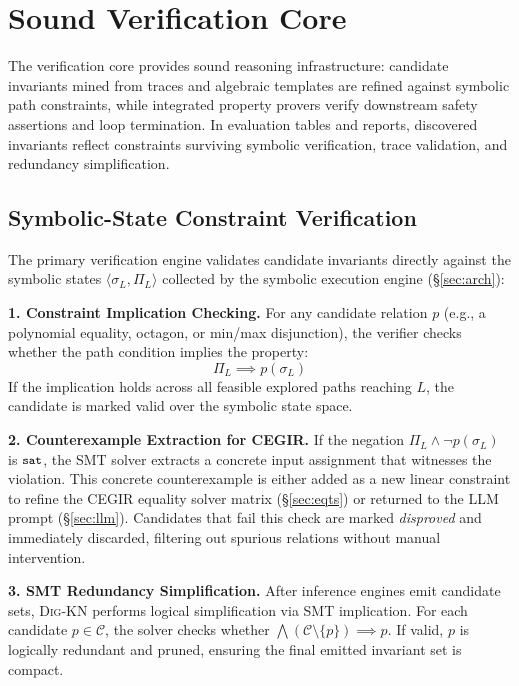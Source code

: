 \documentclass[runningheads]{llncs}
\newcommand{\tool}{\textsc{Dig-KN}\xspace}
\newcommand{\code}[1]{\texttt{\small #1}}
\begin{document}
\section{Sound Verification Core}
\label{sec:verify}

The verification core provides sound reasoning infrastructure: candidate invariants mined from traces and algebraic templates are refined against symbolic path constraints, while integrated property provers verify downstream safety assertions and loop termination. In evaluation tables and reports, discovered invariants reflect constraints surviving symbolic verification, trace validation, and redundancy simplification.

\subsection{Symbolic-State Constraint Verification}
\label{sec:symbolic_ver}

The primary verification engine validates candidate invariants directly against the symbolic states $\langle\sigma_L, \Pi_L\rangle$ collected by the symbolic execution engine (\S\ref{sec:arch}):

\medskip\noindent\textbf{1. Constraint Implication Checking.}
For any candidate relation $p$ (e.g., a polynomial equality, octagon, or min/max disjunction), the verifier checks whether the path condition implies the property:
$$\Pi_L \implies p(\sigma_L)$$
If the implication holds across all feasible explored paths reaching $L$, the candidate is marked valid over the symbolic state space.

\medskip\noindent\textbf{2. Counterexample Extraction for CEGIR.}
If the negation $\Pi_L \land \neg p(\sigma_L)$ is $\code{sat}$, the SMT solver extracts a concrete input assignment that witnesses the violation. This concrete counterexample is either added as a new linear constraint to refine the CEGIR equality solver matrix (\S\ref{sec:eqts}) or returned to the LLM prompt (\S\ref{sec:llm}). Candidates that fail this check are marked \emph{disproved} and immediately discarded, filtering out spurious relations without manual intervention.

\medskip\noindent\textbf{3. SMT Redundancy Simplification.}
After inference engines emit candidate sets, \tool{} performs logical simplification via SMT implication. For each candidate $p \in \mathcal{C}$, the solver checks whether $\bigwedge (\mathcal{C} \setminus \{p\}) \implies p$. If valid, $p$ is logically redundant and pruned, ensuring the final emitted invariant set is compact.
\end{document}
